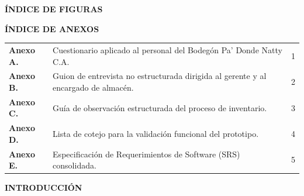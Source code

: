 \documentclass[12pt, letterpaper]{report}
\renewcommand{\listfigurename}{ÍNDICE DE FIGURAS}
\begin{document}
\clearpage
\begin{center}
{\fontsize{14}{16}\selectfont\bfseries ÍNDICE DE FIGURAS\par}
\end{center}
\vspace{8pt}

\begingroup
{}
\renewcommand{\listfigurename}{}
\vspace{-2.5cm}
\listoffigures
\endgroup

\clearpage
\begin{center}
{\fontsize{14}{16}\selectfont\bfseries ÍNDICE DE ANEXOS\par}
\end{center}
\vspace{12pt}

\begingroup
{}
\noindent
\begin{tabular}{@{}p{2.2cm}p{10cm}r@{}}
\textbf{Anexo A.} & Cuestionario aplicado al personal del Bodegón Pa' Donde Natty C.A. & 1 \\[6pt]
\textbf{Anexo B.} & Guion de entrevista no estructurada dirigida al gerente y al encargado de almacén. & 2 \\[6pt]
\textbf{Anexo C.} & Guía de observación estructurada del proceso de inventario. & 3 \\[6pt]
\textbf{Anexo D.} & Lista de cotejo para la validación funcional del prototipo. & 4 \\[6pt]
\textbf{Anexo E.} & Especificación de Requerimientos de Software (SRS) consolidada. & 5 \\[6pt]
\end{tabular}
\endgroup

\clearpage
{}
\hypersetup{pageanchor=true}
\setcounter{page}{1}
\pagestyle{fancy}

\begin{center}
{\fontsize{14}{16}\selectfont\bfseries INTRODUCCIÓN\par}
\end{center}
\vspace{12pt}
\end{document}

